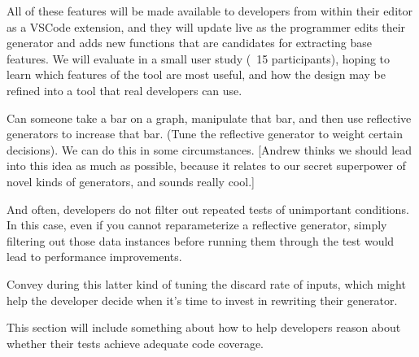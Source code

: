 All of these features will be made available to developers from within their
editor as a VSCode extension, and they will update live as the programmer edits
their generator and adds new functions that are candidates for extracting base
features. We will evaluate \genvis{} in a small user study (~15 participants),
hoping to learn which features of the tool are most useful, and how the design
may be refined into a tool that real developers can use. 



Can someone take a bar on a graph, manipulate that bar, and
then use reflective generators to increase that bar. (Tune
the reflective generator to weight certain decisions). We
can do this in some circumstances. [Andrew thinks we should
lead into this idea as much as possible, because it relates
to our secret superpower of novel kinds of generators, and
sounds really cool.]

And often, developers do not filter out repeated tests of
unimportant conditions. In this case, even if you cannot
reparameterize a reflective generator, simply filtering out
those data instances before running them through the test
would lead to performance improvements.

Convey during this latter kind of tuning the discard rate of
inputs, which might help the developer decide when it's time
to invest in rewriting their generator.


This section will include something about how to help
developers reason about whether their tests achieve adequate
code coverage. 



